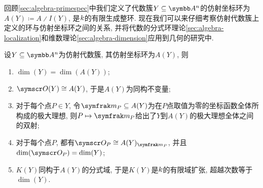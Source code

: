 回顾\ref{sec:algebra-primespec}中我们定义了代数簇$Y\subseteq \AF^n$的仿射坐标环为$A(Y)\coloneq A{\divslash}I(Y)$, 是$k$的有限生成整环. 现在我们可以来仔细考察仿射代数簇上定义的环与仿射坐标环之间的关系, 并将代数的分式环理论\ref{sec:algebra-localization}和维数理论\ref{sec:algebra-dimension}应用到几何的研究中.

\begin{theorem}\label{thm:affinerings}
  设$Y\subseteq \AF^n$为仿射代数簇, 其仿射坐标环为$A(Y)$, 则
  \begin{enumerate}
    \item\label{enum:thm-affine-rings-1} $\dim (Y)=\dim (A(Y))$;
    \item\label{enum:thm-affine-rings-2} $\OO (Y)\cong A(Y)$, 于是$A(Y)$为同构不变量;
    \item\label{enum:thm-affine-rings-3} 对于每个点$P\in Y$, 令$\ideal{m}_P\subseteq A(Y)$为在$P$点取值为零的坐标函数全体所构成的极大理想, 则$P\mapsto \ideal{m}_P$给出了$Y$到$A(Y)$的极大理想全体之间的双射;
    \item\label{enum:thm-affine-rings-4} 对于每个点$P$, 都有$\OO_P\cong A(Y)_{\ideal{m}_P}$, 并且$\dim (\OO_P)=\dim (Y)$;
    \item\label{enum:thm-affine-rings-5} $K(Y)$同构于$A(Y)$的分式域, 于是$K(Y)$是$k$的有限域扩张, 超越次数等于$\dim (Y)$.
  \end{enumerate}
\end{theorem}

